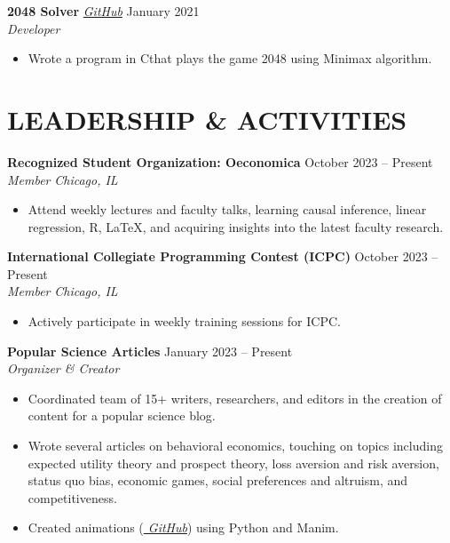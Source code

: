 \documentclass[letterpaper, 9pt]{extarticle}
\newcommand{\CPP}{C\nolinebreak\hspace{-.05em}\raisebox{.4ex}{\tiny\bf +}\nolinebreak\hspace{-.10em}\raisebox{.4ex}{\tiny\bf +}}
\begin{document}
\noindent
\textbf{2048 Solver} 
\emph{\href{https://github.com/AdenChen27/2048_solver}{\color{blue} GitHub}}
\hfill January 2021 \\
\textit{Developer} 
\begin{itemize}
    \item Wrote a program in \CPP \space that plays the game 2048 using Minimax algorithm. 
\end{itemize}

\section*{LEADERSHIP \& ACTIVITIES}


\noindent
\textbf{Recognized Student Organization: Oeconomica} 
\hfill October 2023 -- Present \\
\textit{Member} \hfill \textit{Chicago, IL}
\begin{itemize}
    \item Attend weekly lectures and faculty talks, learning causal inference, linear regression, R, \LaTeX, and acquiring insights into the latest faculty research.
\end{itemize}

\noindent
\textbf{International Collegiate Programming Contest (ICPC)} 
\hfill October 2023 -- Present \\
\textit{Member} \hfill \textit{Chicago, IL}
\begin{itemize}
    \item Actively participate in weekly training sessions for ICPC.
\end{itemize}


\noindent
\textbf{Popular Science Articles} 
\hfill January 2023 -- Present \\
\textit{Organizer \& Creator}
\begin{itemize}
    \item Coordinated team of 15+ writers, researchers, and editors in the creation of content for a popular science blog.
    \item Wrote several articles on behavioral economics, touching on topics including expected utility theory and prospect theory, loss aversion and risk aversion, status quo bias, economic games, social preferences and altruism, and competitiveness. 
    \item Created animations (\emph{\href{https://github.com/AdenChen27/Econic}{\color{blue} GitHub}}) using Python and Manim.
\end{itemize}
\end{document}
